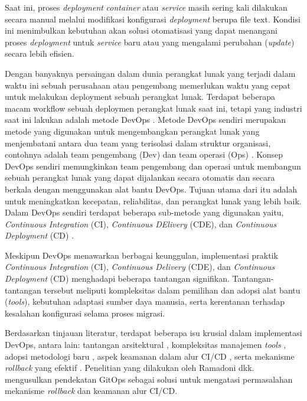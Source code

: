 Saat ini, proses \textit{deployment} \textit{container} atau \textit{service}
masih sering kali dilakukan secara manual melalui modifikasi konfigurasi
\textit{deployment} berupa file text. Kondisi ini menimbulkan kebutuhan akan
solusi otomatisasi yang dapat menangani proses \textit{deployment} untuk
\textit{service} baru atau yang mengalami perubahan (\textit{update}) secara
lebih efisien.
\par
Dengan banyaknya persaingan dalam dunia perangkat lunak yang terjadi dalam
waktu ini sebuah perusahaan atau pengembang memerlukan waktu yang cepat untuk
melakukan deployment sebuah perangkat lunak. Terdapat beberapa macam workflow
sebuah deploymen perangkat lunak saat ini, tetapi yang industri saat ini
lakukan adalah metode DevOps \cite{Bass2018}. Metode DevOps sendiri merupakan
metode yang digunakan untuk mengembangkan perangkat lunak yang menjembatani
antara dua team yang terisolasi dalam struktur organisasi, contohnya adalah
team pengembang (Dev) dan team operasi (Ops) \cite{Bolscher2019}. Konsep DevOps
\cite{Bass2018} sendiri memungkinkan team pengembang dan operasi untuk
membangun sebuah perangkat lunak yang dapat dijalankan secara otomatis dan
secara berkala dengan menggunakan alat bantu DevOps. Tujuan utama dari itu
adalah untuk meningkatkan kecepatan, reliabilitas, dan perangkat lunak yang
lebih baik. Dalam DevOps sendiri terdapat beberapa sub-metode yang digunakan
yaitu, \textit{Continuous Integration} (CI), \textit{Continuous DElivery}
(CDE), dan \textit{Continuous Deployment} (CD) \cite{phoenix2013}.
\par
Meskipun DevOps menawarkan berbagai keunggulan, implementasi praktik
\textit{Continuous Integration} (CI), \textit{Continuous Delivery} (CDE), dan
\textit{Continuous Deployment} (CD) menghadapi beberapa tantangan signifikan.
Tantangan-tantangan tersebut meliputi kompleksitas dalam pemilihan dan adopsi
alat bantu (\textit{tools}), kebutuhan adaptasi sumber daya manusia, serta
kerentanan terhadap kesalahan konfigurasi selama proses migrasi.

Berdasarkan tinjauan literatur, terdapat beberapa isu krusial dalam
implementasi DevOps, antara lain: tantangan arsitektural \cite{Bolscher2019},
kompleksitas manajemen \textit{tools} \cite{Proulx2018}, adopsi metodologi baru
\cite{Abbass2019, Leite2019}, aspek keamanan dalam alur CI/CD
\cite{Shahin2017}, serta mekanisme \textit{rollback} yang efektif
\cite{Fritzsch2019}. Penelitian yang dilakukan oleh Ramadoni dkk.
\cite{Ramadoni2021} mengusulkan pendekatan GitOps sebagai solusi untuk
mengatasi permasalahan mekanisme \textit{rollback} dan keamanan alur CI/CD.

